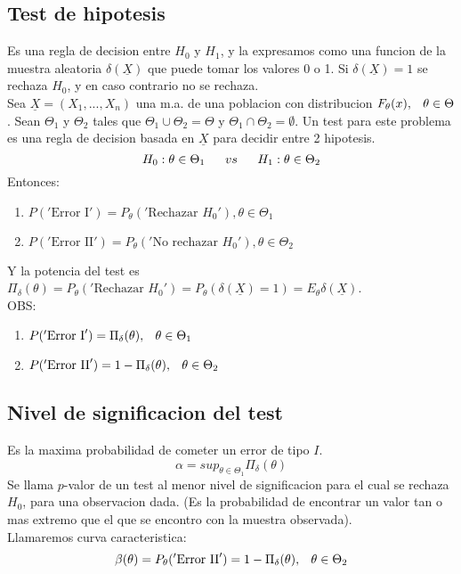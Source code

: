 \documentclass[titlepage,a4paper]{article}
\begin{document}
\subsection{Test de hipotesis}
Es una regla de decision entre $H_{0}$ y $H_{1}$, y la expresamos como una funcion de la muestra aleatoria $\delta(\underline{X})$ que puede tomar los valores 0 o 1.
Si $\delta(\underline{X}) = 1$ se rechaza $H_{0}$, y en caso contrario no se rechaza.\\
Sea $\underline{X} = (X_{1},...,X_{n})$ una m.a. de una poblacion con distribucion $F_{\theta} (x), \hspace{8px} \theta \in \Theta $.
Sean $\Theta_{1}$ y $\Theta_{2}$ tales que $\Theta_{1} \cup \Theta_{2} = \Theta$ y $\Theta_{1} \cap  \Theta_{2} = \emptyset $. Un test para este problema es una regla de decision basada en $\underline{X}$ para decidir entre 2 hipotesis.
\begin{equation*}
    H_{0}: \theta \in \Theta_{1} \hspace{16px} vs \hspace{16px} H_{1}: \theta \in \Theta_{2}
\end{equation*}
Entonces:
\begin{enumerate}
    \item $P('\text{Error I}') = P_{\theta}('\text{Rechazar }H_{0}'), \theta \in \Theta_{1} $
    \item $P('\text{Error II}') = P_{\theta}('\text{No rechazar }H_{0}'), \theta \in \Theta_{2} $
\end{enumerate}
Y la potencia del test es $\Pi_{\delta}(\theta) = P_{\theta}('\text{Rechazar }H_{0}') = P_{\theta}(\delta(\underline{X}) =1 ) = E_{\theta}\delta(\underline{X})$.\\
OBS:
\begin{enumerate}
    \item $P('\text{Error I}') = \Pi_{\delta}(\theta), \hspace{8px} \theta \in \Theta_{1}$
    \item $P('\text{Error II}') = 1- \Pi_{\delta}(\theta), \hspace{8px} \theta \in \Theta_{2}$
\end{enumerate}
\subsection{Nivel de significacion del test}
Es la maxima probabilidad de cometer un error de tipo $I$.
\begin{equation*}
    \alpha = sup_{\theta \in \Theta_{1}} \Pi_{\delta}(\theta)
\end{equation*}
Se llama \color{violet} $p$-valor \color{black} de un test al menor nivel de significacion para el cual se rechaza $H_{0}$, para una observacion dada.
(Es la probabilidad de encontrar un valor tan o mas extremo que el que se encontro con la muestra observada).\\
Llamaremos curva caracteristica:
\begin{equation*}
    \beta(\theta) = P_{\theta}('\text{Error II}') = 1- \Pi_{\delta}(\theta), \hspace{8px} \theta \in \Theta_{2}
\end{equation*}
\end{document}
